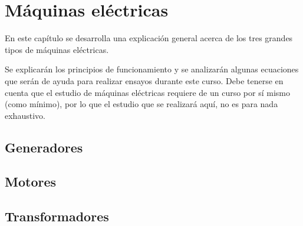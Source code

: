 \chapter{Máquinas eléctricas}
En este capítulo se desarrolla una explicación general acerca de los tres grandes tipos de máquinas eléctricas.

Se explicarán los principios de funcionamiento y se analizarán algunas ecuaciones que serán de ayuda para realizar ensayos durante este curso. Debe tenerse en cuenta que el estudio de máquinas eléctricas requiere de un curso por sí mismo (como mínimo), por lo que el estudio que se realizará aquí, no es para nada exhaustivo.

\section{Generadores}
\section{Motores}
\section{Transformadores}
